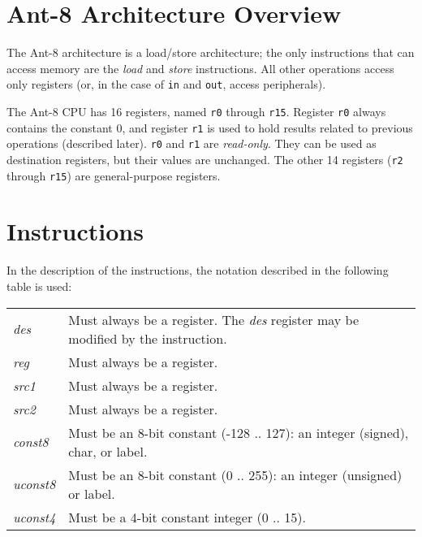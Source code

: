 %

\section{{\sc Ant-8} Architecture Overview}

The {\sc Ant-8} architecture is a load/store architecture; the only
instructions that can access memory are the {\em load} and {\em store}
instructions.  All other operations access only registers (or, in the
case of {\tt in} and {\tt out}, access peripherals).

The {\sc Ant-8} CPU has 16 registers, named {\tt r0} through {\tt r15}.
Register {\tt r0} always contains the constant 0, and register
{\tt r1} is used to hold results related to previous operations
(described later).  {\tt r0} and {\tt r1} are {\em read-only}.
They can be used as destination registers, but their values are
unchanged.
The other 14 registers ({\tt r2} through {\tt r15}) are
general-purpose registers.

\section{Instructions}
\label{mnemonic-sec}

In the description of the instructions, the notation described in
the following table is used:

\vspace{3mm}
\begin{center}
\begin{tabular}{|lp{5.5in}|}
\hline
{\em des}       & Must always be a register. The {\em des} register
			may be modified by the instruction. \\
{\em reg}       & Must always be a register. \\
{\em src1}      & Must always be a register. \\
{\em src2}      & Must always be a register. \\
{\em const8}     & Must be an 8-bit constant (-128 .. 127):
			an integer (signed), char, or label. \\
{\em uconst8}	& Must be an 8-bit constant (0 .. 255):
			an integer (unsigned) or label. \\
{\em uconst4}	& Must be a 4-bit constant integer (0 .. 15). \\
\hline
\end{tabular}
\end{center}
\vspace{3mm}

